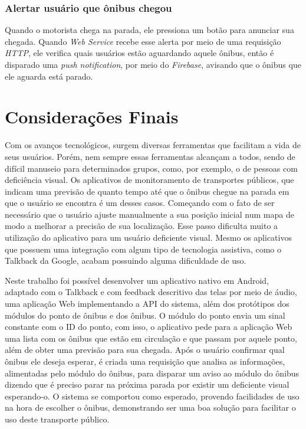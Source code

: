 \documentclass[
	12pt,				%
	oneside,			%
	a4paper,			%
	brazil				%
]{abntex2}
\begin{document}
\subsection{Alertar usuário que ônibus chegou}

Quando o motorista chega na parada, ele pressiona um botão para anunciar sua chegada. Quando \textit{Web Service} recebe esse alerta por meio de uma requisição \textit{HTTP}, ele verifica quais usuários estão aguardando aquele ônibus, então é disparado uma \textit{push notification}, por meio do \textit{Firebase}, avisando que o ônibus que ele aguarda está parado.

\chapter{Considerações Finais}

Com os avanços tecnológicos, surgem diversas ferramentas que facilitam a vida de seus usuários. Porém, nem sempre essas ferramentas alcançam a todos, sendo de difícil manuseio para determinados grupos, como, por exemplo, o de pessoas com deficiência visual. Os aplicativos de monitoramento de transportes públicos, que indicam uma previsão de quanto tempo até que o ônibus chegue na parada em que o usuário se encontra é um desses casos. Começando com o fato de ser necessário que o usuário ajuste manualmente a sua posição inicial num mapa de modo a melhorar a precisão de sua localização. Esse passo dificulta muito a utilização do aplicativo para um usuário deficiente visual. Mesmo os aplicativos que possuem uma integração com algum tipo de tecnologia assistiva, como o Talkback da Google, acabam possuindo alguma dificuldade de uso.

Neste trabalho foi possível desenvolver um aplicativo nativo em Android, adaptado com o Talkback e com feedback descritivo das telas por meio de áudio, uma aplicação Web implementando a API do sistema, além dos protótipos dos módulos do ponto de ônibus e dos ônibus. O módulo do ponto envia um sinal constante com o ID do ponto, com isso, o aplicativo pede para a aplicação Web uma lista com os ônibus que estão em circulação e que passam por aquele ponto, além de obter uma previsão para sua chegada. Após o usuário confirmar qual ônibus ele deseja esperar, é criada uma requisição que analisa as informações, alimentadas pelo módulo do ônibus, para disparar um aviso ao módulo do ônibus dizendo que é preciso parar na próxima parada por existir um deficiente visual esperando-o. O sistema se comportou como esperado, provendo facilidades de uso na hora de escolher o ônibus, demonstrando ser uma boa solução para facilitar o uso deste transporte público.
\end{document}
